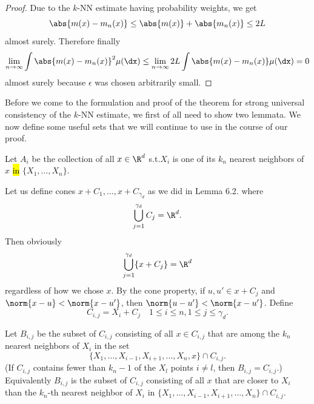 \begin{proof}
    Due to the $k$-NN estimate having probability weights, we get
    \[
        \abs{m(x) - m_n(x)} \leq \abs{m(x)} + \abs{m_n(x)} \leq 2L
    \]
    almost surely.
    Therefore finally
    \begin{align*}
        \lim_{n \to \infty} \int \abs{m(x) - m_n(x)}^2 \mu(\dx)
        \leq \lim_{n \to \infty} 2L\int \abs{m(x) - m_n(x)} \mu(\dx)
        = 0
    \end{align*}
    almost surely because \(\epsilon\) was chosen arbitrarily small.
   
    
    
\end{proof}

Before we come to the formulation and proof of the theorem for strong universal consistency of the $k$-NN estimate, we first of all need to show two lemmata. We now define some useful sets that we will continue to use in the course of our proof.

\begin{definition} \label{knnai}
    Let \(A_i\) be the collection of all \(x \in \R^d\) s.t.\@ \(X_i\) is one of its \(k_n\) nearest neighbors of \(x\) \hl{in} \(\{X_1, \ldots, X_n\}\).
\end{definition}

 Let us define cones \(x + C_1, \ldots, x + C_{\gamma_d}\) as we did in Lemma 6.2. where 
\begin{align*}
    \bigcup_{j=1}^{\gamma_d} C_j = \R^d.
\end{align*}
Then obviously
\begin{align} \label{cover}
    \bigcup_{j=1}^{\gamma_d} \{x + C_j\} = \R^d
\end{align}
regardless of how we chose \(x\). By the cone property, if \(u, u' \in x + C_j\) and \(\norm{x - u} < \norm{x - u'}\), then \(\norm{u - u'} < \norm{x - u'}\). Define
\[
    C_{i, j} = X_i + C_j \quad 1 \leq i \leq n, 1 \leq j \leq \gamma_d.
\]

\begin{definition} \label{knnbi}
    Let \(B_{i, j}\) be the subset of \(C_{i, j}\) consisting of all \(x \in C_{i, j}\) that are among the \(k_n\) nearest neighbors of \(X_i\) in the set
    \[
        \{X_1, \ldots, X_{i-1},X_{i+1}, \ldots, X_n, x\} \cap C_{i, j}. 
    \]
    (If \(C_{i, j}\) contains fewer than \(k_n-1\) of the \(X_l\) points \(i \neq l\), then \(B_{i, j} = C_{i, j}\).) Equivalently \(B_{i, j}\) is the subset of \(C_{i, j}\) consisting of all \(x\) that are closer to \(X_i\) than the \(k_n\)-th nearest neighbor of \(X_i\) in \(\{X_1, \ldots, X_{i-1}, X_{i+1}, \ldots, X_n\} \cap C_{i, j}\).
    
\end{definition}

